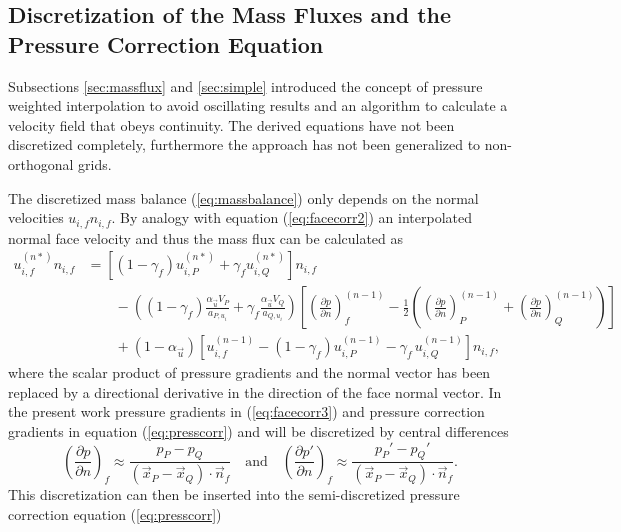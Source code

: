   \subsection{Discretization of the Mass Fluxes and the Pressure Correction Equation}
  \label{sec:segpresscorr}

  Subsections \ref{sec:massflux} and \ref{sec:simple} introduced the concept of pressure weighted interpolation to avoid oscillating results and an algorithm to calculate a velocity field that obeys continuity. The derived equations have not been discretized completely, furthermore the approach has not been generalized to non-orthogonal grids.

  The discretized mass balance (\ref{eq:massbalance}) only depends on the normal velocities \(u_{i,f} n_{i,f}\). By analogy with equation (\ref{eq:facecorr2}) an interpolated normal face velocity and thus the mass flux can be calculated as
  \begin{align}
    \label{eq:facecorr3}
    u_{i,f}^{(n*)} n_{i,f}
    &=
    \left[\left(1 - \gamma_f\right) u_{i,P}^{(n*)} + \gamma_f u_{i,Q}^{(n*)} \right]n_{i,f} \nonumber\\[1em]
    &\quad\quad - 
    \left(\left(1 - \gamma_f\right) \frac{\alpha_\vec{u} V_P}{a_{P,u_i}} + \gamma_f \frac{\alpha_\vec{u} V_Q}{a_{Q,u_i}}\right)
    \left[ 
    \left(\frac{\partial p}{\partial n}\right)_f^{(n-1)} 
    -  \frac{1}{2} \left( \left( \frac{\partial p}{\partial n} \right)_P^{(n-1)} 
    +  \left(\frac{\partial p}{\partial n}\right)_Q^{(n-1)} \right)
  \right] \nonumber \\[1em]
  &\quad\quad + \left(1 - \alpha_\vec{u}\right) \left[ u_{i,f}^{(n-1)} - \left(1 - \gamma_f\right) u_{i,P}^{(n-1)} - \gamma_f \, u_{i,Q}^{(n-1)} \right] n_{i,f},
  \end{align}
  where the scalar product of pressure gradients and the normal vector has been replaced by a directional derivative in the direction of the face normal vector. In the present work pressure gradients in (\ref{eq:facecorr3}) and pressure correction gradients in equation (\ref{eq:presscorr}) and will be discretized by central differences
  \begin{equation}
  \left(\frac{\partial p}{\partial n}\right)_f \approx \frac{p_P - p_Q}{\left(\vec{x}_P - \vec{x}_Q\right)\cdot \vec{n}_f} 
  \quad \text{and} \quad 
  \left(\frac{\partial p'}{\partial n}\right)_f \approx \frac{p_P' - p_Q'}{\left(\vec{x}_P - \vec{x}_Q\right)\cdot \vec{n}_f}.
  \end{equation}
  This discretization can then be inserted into the semi-discretized pressure correction equation (\ref{eq:presscorr}) 
